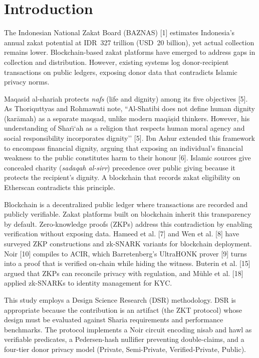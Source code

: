\documentclass[conference]{IEEEtran}
\begin{document}
\section{Introduction}

The Indonesian National Zakat Board (BAZNAS) [1] estimates Indonesia's annual zakat potential at IDR~327 trillion (USD~20 billion), yet actual collection remains lower. Blockchain-based zakat platforms have emerged to address gaps in collection and distribution. However, existing systems log donor-recipient transactions on public ledgers, exposing donor data that contradicts Islamic privacy norms.

Maqasid al-shariah protects \textit{nafs} (life and dignity) among its five objectives [5]. As Thoriquttyas and Rohmawati note, ``Al-Shatibi does not define human dignity (kar\={a}mah) as a separate maq\d{s}ad, unlike modern maq\={a}\d{s}id thinkers. However, his understanding of Shar\={\i}`ah as a religion that respects human moral agency and social responsibility incorporates dignity'' [5]. Ibn Ashur extended this framework to encompass financial dignity, arguing that exposing an individual's financial weakness to the public constitutes harm to their honour [6]. Islamic sources give concealed charity (\textit{sadaqah al-sirr}) precedence over public giving because it protects the recipient's dignity. A blockchain that records zakat eligibility on Etherscan contradicts this principle.

Blockchain is a decentralized public ledger where transactions are recorded and publicly verifiable. Zakat platforms built on blockchain inherit this transparency by default. Zero-knowledge proofs (ZKPs) address this contradiction by enabling verification without exposing data. Hameed et al. [7] and Wen et al. [8] have surveyed ZKP constructions and zk-SNARK variants for blockchain deployment. Noir [10] compiles to ACIR, which Barretenberg's UltraHONK prover [9] turns into a proof that is verified on-chain while hiding the witness. Buterin et al. [15] argued that ZKPs can reconcile privacy with regulation, and M\"{u}hle et al. [18] applied zk-SNARKs to identity management for KYC.

This study employs a Design Science Research (DSR) methodology. DSR is appropriate because the contribution is an artifact (the ZKT protocol) whose design must be evaluated against Sharia requirements and performance benchmarks. The protocol implements a Noir circuit encoding nisab and hawl as verifiable predicates, a Pedersen-hash nullifier preventing double-claims, and a four-tier donor privacy model (Private, Semi-Private, Verified-Private, Public).
\end{document}
